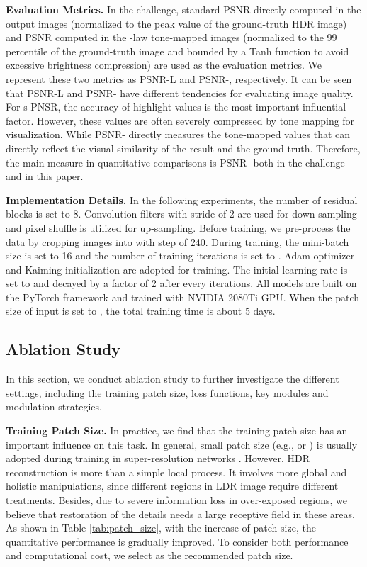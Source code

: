 \documentclass[final]{cvpr}
\begin{document}
\textbf{Evaluation Metrics.} In the challenge, standard PSNR directly computed in the output images (normalized to the peak value of the ground-truth HDR image) and PSNR computed in the -law tone-mapped images (normalized to the 99 percentile of the ground-truth image and bounded by a Tanh function to avoid excessive brightness compression) are used as the evaluation metrics. We represent these two metrics as PSNR-L and PSNR-, respectively. It can be seen that PSNR-L and PSNR- have different tendencies for evaluating image quality. For s-PNSR, the accuracy of highlight values is the most important influential factor. However, these values are often severely compressed by tone mapping for visualization. While PSNR- directly measures the tone-mapped values that can directly reflect the visual similarity of the result and the ground truth. Therefore, the main measure in quantitative comparisons is PSNR- both in the challenge and in this paper.

\textbf{Implementation Details.} In the following experiments, the number of residual blocks  is set to 8. Convolution filters with stride of 2 are used for down-sampling and pixel shuffle \cite{shi2016real} is utilized for up-sampling. Before training, we pre-process the data by cropping images into  with step of 240. During training, the mini-batch size is set to 16 and the number of training iterations is set to . Adam \cite{kingma2014adam} optimizer and Kaiming-initialization \cite{he2015delving} are adopted for training. The initial learning rate is set to  and decayed by a factor of 2 after every  iterations. All models are built on the PyTorch framework and trained with NVIDIA 2080Ti GPU. When the patch size of input is set to , the total training time is about 5 days.

\subsection{Ablation Study}\label{sec:ablation_study}
In this section, we conduct ablation study to further investigate the different settings, including the training patch size, loss functions, key modules and modulation strategies.

\textbf{Training Patch Size.}
In practice, we find that the training patch size has an important influence on this task. In general,  small patch size (e.g.,  or ) is usually adopted during training in super-resolution networks \cite{dong2014learning, wang2019edvr}. However, HDR reconstruction is more than a simple local process. It involves more global and holistic manipulations, since different regions in LDR image require different treatments. Besides, due to severe information loss in over-exposed regions, we believe that restoration of the details needs a large receptive field in these areas. As shown in Table \ref{tab:patch_size}, with the increase of patch size, the quantitative performance is gradually improved. To consider both performance and computational cost, we select  as the recommended patch size.
\end{document}
